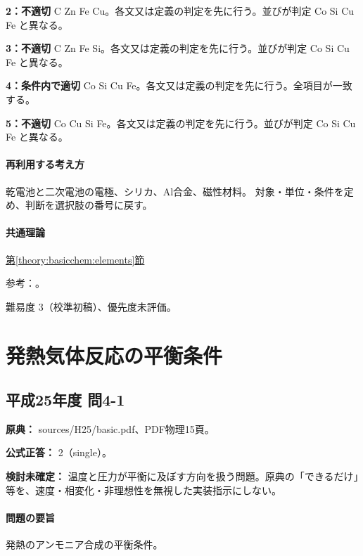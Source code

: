 \noindent\textbf{2：不適切} C Zn Fe Cu。各文又は定義の判定を先に行う。並びが判定 Co Si Cu Fe と異なる。\par

\noindent\textbf{3：不適切} C Zn Fe Si。各文又は定義の判定を先に行う。並びが判定 Co Si Cu Fe と異なる。\par

\noindent\textbf{4：条件内で適切} Co Si Cu Fe。各文又は定義の判定を先に行う。全項目が一致する。\par

\noindent\textbf{5：不適切} Co Cu Si Fe。各文又は定義の判定を先に行う。並びが判定 Co Si Cu Fe と異なる。\par

\paragraph{再利用する考え方} 乾電池と二次電池の電極、シリカ、Al合金、磁性材料。 対象・単位・条件を定め、判断を選択肢の番号に戻す。

\paragraph{共通理論} \hyperref[theory:basicchem:elements]{第\ref*{theory:basicchem:elements}節}

\par 参考：\cite{openstax_batteries,chem55_fiber,chem55_duralumin,openstax_magnetism}。

\par 難易度 3（校準初稿）、優先度未評価。

\section{発熱気体反応の平衡条件}

\subsection{平成25年度 問4-1}
\label{q:h25-reg-basic-4-1}

\noindent\textbf{原典：} sources/H25/basic.pdf、PDF物理15頁。

\textbf{公式正答：} 2（single）。

\par\textbf{検討未確定：} 温度と圧力が平衡に及ぼす方向を扱う問題。原典の「できるだけ」等を、速度・相変化・非理想性を無視した実装指示にしない。

\paragraph{問題の要旨} 発熱のアンモニア合成の平衡条件。


